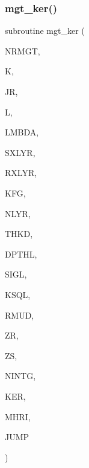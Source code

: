 \subsubsection{\texorpdfstring{mgt\+\_\+ker()}{mgt\_ker()}}
{\footnotesize\ttfamily subroutine mgt\+\_\+ker (\begin{DoxyParamCaption}\item[{integer}]{N\+R\+M\+GT,  }\item[{integer}]{K,  }\item[{integer}]{JR,  }\item[{integer}]{L,  }\item[{real(kind=ql)}]{L\+M\+B\+DA,  }\item[{integer}]{S\+X\+L\+YR,  }\item[{integer}]{R\+X\+L\+YR,  }\item[{integer}]{K\+FG,  }\item[{integer}]{N\+L\+YR,  }\item[{real(kind=ql), dimension (nlyr)}]{T\+H\+KD,  }\item[{real(kind=ql), dimension (nlyr)}]{D\+P\+T\+HL,  }\item[{complex(kind=ql), dimension (nlyr)}]{S\+I\+GL,  }\item[{complex(kind=ql), dimension (nlyr)}]{K\+S\+QL,  }\item[{real(kind=ql), dimension(0\+:nlyr)}]{R\+M\+UD,  }\item[{real(kind=ql)}]{ZR,  }\item[{real(kind=ql)}]{ZS,  }\item[{integer}]{N\+I\+N\+TG,  }\item[{complex(kind=ql), dimension(jnlo-\/nrmgt\+:jnhi,5)}]{K\+ER,  }\item[{complex(kind=ql), dimension(nrmgt,5)}]{M\+H\+RI,  }\item[{logical}]{J\+U\+MP }\end{DoxyParamCaption})}

